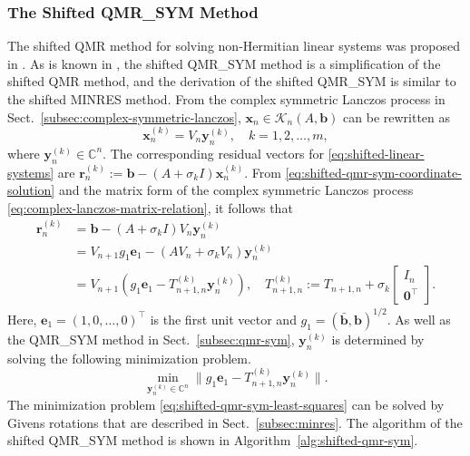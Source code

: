 \subsubsection{{The Shifted QMR\_SYM Method}}\label{subsec:shifted-qmr-sym}
{The shifted QMR method for solving non-Hermitian linear systems was proposed in . As is known in , the shifted QMR\_SYM method is a simplification of the shifted QMR method, and the derivation of the shifted QMR\_SYM is similar to the shifted MINRES method.}
{From the complex symmetric Lanczos process in Sect.\ \ref{subsec:complex-symmetric-lanczos}, $\bm x_n\in\mathcal K_n(A,\bm b)$ can be rewritten as}
\begin{equation}\label{eq:shifted-qmr-sym-coordinate-solution}\bm x_n^{(k)}=V_n\bm y_n^{(k)},\quad k=1,2,\ldots,m,\end{equation}
{where $\bm y_n^{(k)}\in\mathbb C^n$. The corresponding residual vectors for \eqref{eq:shifted-linear-systems} are $\bm r_n^{(k)}:=\bm b-(A+\sigma_k I)\bm x_n^{(k)}$. From \eqref{eq:shifted-qmr-sym-coordinate-solution} and the matrix form of the complex symmetric Lanczos process \eqref{eq:complex-lanczos-matrix-relation}, it follows that}
\begin{equation}\label{eq:shifted-qmr-sym-projected-residual}\begin{aligned}\bm r_n^{(k)}&=\bm b-(A+\sigma_k I)V_n\bm y_n^{(k)}\\&=V_{n+1}g_1\bm e_1-(AV_n+\sigma_kV_n)\bm y_n^{(k)}\\&=V_{n+1}(g_1\bm e_1-T_{n+1,n}^{(k)}\bm y_n^{(k)}),\quad T_{n+1,n}^{(k)}:=T_{n+1,n}+\sigma_k\begin{bmatrix}I_n\\\bm0^{\top}\end{bmatrix}.\end{aligned}\end{equation}
{Here, $\bm e_1=(1,0,\ldots,0)^{\top}$ is the first unit vector and $g_1=(\bar{\bm b},\bm b)^{1/2}$. As well as the QMR\_SYM method in Sect.\ \ref{subsec:qmr-sym}, $\bm y_n^{(k)}$ is determined by solving the following minimization problem.}
\begin{equation}\label{eq:shifted-qmr-sym-least-squares}\min_{\bm y_n^{(k)}\in\mathbb C^n}\|g_1\bm e_1-T_{n+1,n}^{(k)}\bm y_n^{(k)}\|.\end{equation}
{The minimization problem \eqref{eq:shifted-qmr-sym-least-squares} can be solved by Givens rotations that are described in Sect.\ \ref{subsec:minres}. The algorithm of the shifted QMR\_SYM method is shown in Algorithm\ \ref{alg:shifted-qmr-sym}.}
